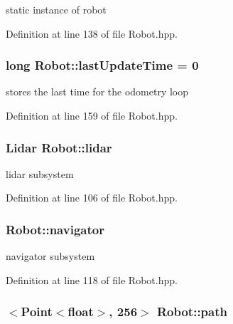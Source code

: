static instance of robot 



Definition at line 138 of file Robot.\-hpp.

\hypertarget{classRobot_a82a33c66efce935d2cac37c9f11c6efd}{
\subsubsection[{last\-Update\-Time}]{\setlength{\rightskip}{0pt plus 5cm}long Robot\-::last\-Update\-Time = 0\hspace{0.3cm}{\ttfamily [private]}}}\label{classRobot_a82a33c66efce935d2cac37c9f11c6efd}


stores the last time for the odometry loop 



Definition at line 159 of file Robot.\-hpp.

\hypertarget{classRobot_a222e54f477e23f5af80cfa10bcd85e7a}{
\subsubsection[{lidar}]{\setlength{\rightskip}{0pt plus 5cm}Lidar Robot\-::lidar}}\label{classRobot_a222e54f477e23f5af80cfa10bcd85e7a}


lidar subsystem 



Definition at line 106 of file Robot.\-hpp.

\hypertarget{classRobot_a71e296a4f32c3a81b5a9fabeac12747b}{
\subsubsection[{navigator}]{ Robot\-::navigator}}\label{classRobot_a71e296a4f32c3a81b5a9fabeac12747b}


navigator subsystem 



Definition at line 118 of file Robot.\-hpp.

\hypertarget{classRobot_a36d071e82aea40470cea9559477e5115}{
\subsubsection[{path}]{$<${\bf Point}$<$float$>$, 256$>$ Robot\-::path}}\label{classRobot_a36d071e82aea40470cea9559477e5115}


